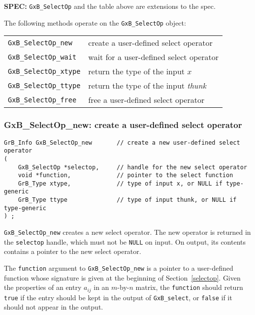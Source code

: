 \documentclass[12pt]{article}
\begin{document}
\begin{spec}
{\bf SPEC:} \verb'GxB_SelectOp' and the table above
are extensions to the spec.
\end{spec}

The following methods operate on the \verb'GxB_SelectOp' object:

\vspace{0.1in}
{\footnotesize
\begin{tabular}{ll}
\hline
\verb'GxB_SelectOp_new'   & create a user-defined select operator  \\
\verb'GxB_SelectOp_wait'  & wait for a user-defined select operator \\
\verb'GxB_SelectOp_xtype' & return the type of the input $x$ \\
\verb'GxB_SelectOp_ttype' & return the type of the input {\em thunk} \\
\verb'GxB_SelectOp_free'  & free a user-defined select operator  \\
\hline
\end{tabular}
}
\vspace{0.1in}

\subsubsection{{\sf GxB\_SelectOp\_new:} create a user-defined select operator}
\label{selectop_new}

\begin{mdframed}[userdefinedwidth=6in]
{\footnotesize
\begin{verbatim}
GrB_Info GxB_SelectOp_new       // create a new user-defined select operator
(
    GxB_SelectOp *selectop,     // handle for the new select operator
    void *function,             // pointer to the select function
    GrB_Type xtype,             // type of input x, or NULL if type-generic
    GrB_Type ttype              // type of input thunk, or NULL if type-generic
) ;
\end{verbatim} }\end{mdframed}

\verb'GxB_SelectOp_new' creates a new select operator.  The new operator is
returned in the \verb'selectop' handle, which must not be \verb'NULL' on input.
On output, its contents contains a pointer to the new select operator.

The \verb'function' argument to \verb'GxB_SelectOp_new' is a pointer to a
user-defined function whose signature is given at the beginning of
Section~\ref{selectop}.  Given the properties of an entry $a_{ij}$ in an
$m$-by-$n$ matrix, the \verb'function' should return \verb'true' if the entry
should be kept in the output of \verb'GxB_select', or \verb'false' if it should
not appear in the output.
\end{document}
